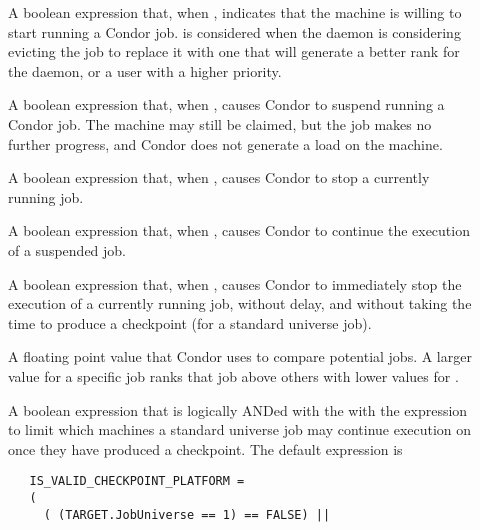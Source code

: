 \begin{description}

\item[] \label{param:Start}  A boolean expression
  that, when , indicates that the machine is willing
  to start running a Condor job.
   is considered when the  daemon
  is considering evicting the job to replace it with one that will
  generate a better rank for the  daemon,
  or a user with a higher priority.

\item[] \label{param:Suspend}  A boolean expression
   that, when , causes Condor to suspend running
   a Condor job.
   The machine may still be claimed, but the job makes no further
   progress, and Condor does not generate a load on the machine.

\item[] \label{param:Preempt}   A boolean expression
   that, when , causes Condor to stop a currently
   running job.

\item[] \label{param:Continue}  A boolean expression
   that, when , causes Condor to continue the execution
   of a suspended job.

\item[] \label{param:Kill}  A boolean expression
   that, when , causes Condor to immediately stop the
   execution of a currently running job, without delay, and
   without taking the time to produce a checkpoint (for a standard
   universe job).

\item[] \label{param:Rank}  A floating point value
   that Condor uses to compare potential jobs.
   A larger value for a specific job ranks that job above
   others with lower values for .

\item[] \label{param:IsValidCheckpointPlatform} A boolean expression that is logically ANDed with the
   with the  expression to limit which machines a
   standard universe job may continue execution on once they have
   produced a checkpoint.
   The default expression is

   \footnotesize
   \begin{verbatim}
   IS_VALID_CHECKPOINT_PLATFORM =
   (
     ( (TARGET.JobUniverse == 1) == FALSE) ||
   

\end{verbatim}
\end{description}
